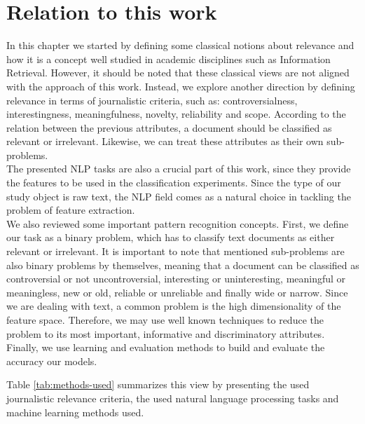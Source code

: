 

\section{Relation to this work}

In this chapter we started by defining some classical notions about relevance and how it is a concept well studied in academic disciplines such as Information Retrieval. However, it should be noted that these classical views are not aligned with the approach of this work. Instead, we explore another direction by defining relevance in terms of journalistic criteria, such as: controversialness, interestingness, meaningfulness, novelty, reliability and scope. According to the relation between the previous attributes, a document should be classified as relevant or irrelevant. Likewise, we can treat these attributes as their own sub-problems. \\
The presented NLP tasks are also a crucial part of this work, since they provide the features to be used in the classification experiments. Since the type of our study object is raw text, the NLP field comes as a natural choice in tackling the problem of feature extraction. \\
We also reviewed some important pattern recognition concepts. First, we define our task as a binary problem, which has to classify text documents as either relevant or irrelevant. It is important to note that mentioned sub-problems are also binary problems by themselves, meaning that a document can be classified as controversial or not uncontroversial, interesting or uninteresting, meaningful or meaningless, new or old, reliable or unreliable and finally wide or narrow. Since we are dealing with text, a common problem is the high dimensionality of the feature space. Therefore, we may use well known techniques to reduce the problem to its most important, informative and discriminatory attributes. Finally, we use learning and evaluation methods to build and evaluate the accuracy our models.

Table \ref{tab:methods-used} summarizes this view by presenting the used journalistic relevance criteria, the used natural language processing tasks and machine learning methods used. 


